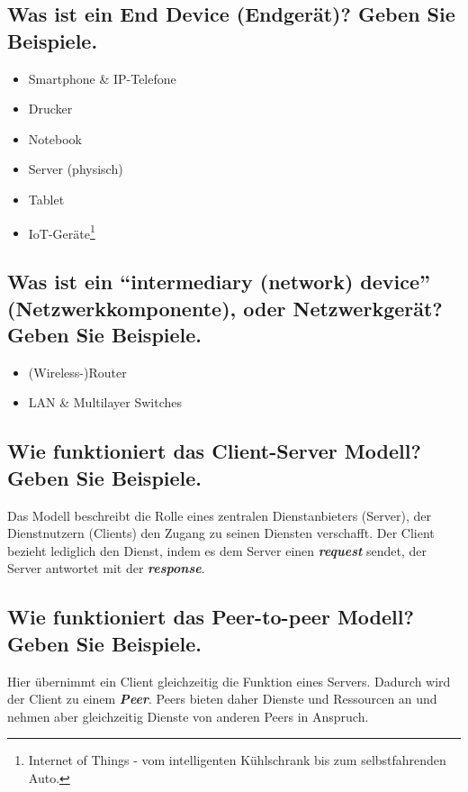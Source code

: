 \pagebreak

\subsection*{Was ist ein \flqq End Device\frqq{} (Endgerät)? Geben Sie Beispiele.}
\begin{itemize}
    \item Smartphone \& IP-Telefone
    \item Drucker
    \item Notebook
    \item Server (physisch)
    \item Tablet
    \item IoT-Geräte\footnote{Internet of Things - vom intelligenten Kühlschrank bis zum selbstfahrenden Auto.}
\end{itemize}

\subsection*{Was ist ein ``intermediary (network) device'' (Netzwerkkomponente), oder Netzwerkgerät? Geben Sie Beispiele.}
\begin{itemize}
    \item (Wireless-)Router
    \item LAN \& Multilayer Switches
\end{itemize}

\subsection*{Wie funktioniert das \flqq Client-Server\frqq{} Modell? Geben Sie Beispiele.}
Das Modell beschreibt die Rolle eines zentralen Dienstanbieters (Server), der Dienstnutzern (Clients) den Zugang zu seinen Diensten verschafft. Der Client bezieht lediglich den Dienst, indem es dem Server einen \textsl{\textbf{request}} sendet, der Server antwortet mit der \textsl{\textbf{response}}.

\subsection*{Wie funktioniert das \flqq Peer-to-peer\frqq{} Modell? Geben Sie Beispiele.}
Hier übernimmt ein Client gleichzeitig die Funktion eines Servers. Dadurch wird der Client zu einem \textsl{\textbf{Peer}}. Peers bieten daher Dienste und Ressourcen an und nehmen aber gleichzeitig Dienste von anderen Peers in Anspruch.

